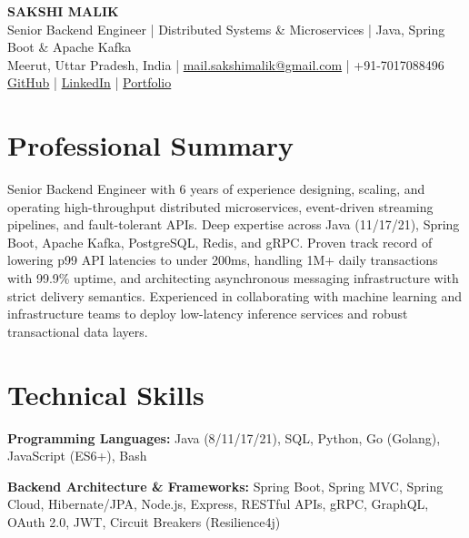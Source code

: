 \documentclass[10pt,a4paper]{article}
\begin{document}

\begin{center}
  {\LARGE\textbf{SAKSHI MALIK}}\\[3pt]
  {\normalsize
  Senior Backend Engineer \quad|\quad
  Distributed Systems \& Microservices \quad|\quad
  Java, Spring Boot \& Apache Kafka}\\[5pt]

  Meerut, Uttar Pradesh, India
  \quad|\quad
  \href{mailto:mail.sakshimalik@gmail.com}{mail.sakshimalik@gmail.com}
  \quad|\quad
  +91-7017088496\\[2pt]

  \href{https://github.com/sakshi-labs}{GitHub}
  \quad|\quad
  \href{https://linkedin.com/in/sakshiimalik}{LinkedIn}
  \quad|\quad
  \href{https://sakshi-labs.github.io/Portfolio/}{Portfolio}
\end{center}


\section{Professional Summary}

Senior Backend Engineer with 6 years of experience designing, scaling, and operating high-throughput distributed microservices, event-driven streaming pipelines, and fault-tolerant APIs. Deep expertise across Java (11/17/21), Spring Boot, Apache Kafka, PostgreSQL, Redis, and gRPC. Proven track record of lowering p99 API latencies to under 200ms, handling 1M+ daily transactions with 99.9\% uptime, and architecting asynchronous messaging infrastructure with strict delivery semantics. Experienced in collaborating with machine learning and infrastructure teams to deploy low-latency inference services and robust transactional data layers.


\section{Technical Skills}

\textbf{Programming Languages:}
Java (8/11/17/21), SQL, Python, Go (Golang), JavaScript (ES6+), Bash

\textbf{Backend Architecture \& Frameworks:}
Spring Boot, Spring MVC, Spring Cloud, Hibernate/JPA, Node.js, Express, RESTful APIs, gRPC, GraphQL, OAuth 2.0, JWT, Circuit Breakers (Resilience4j)
\end{document}
